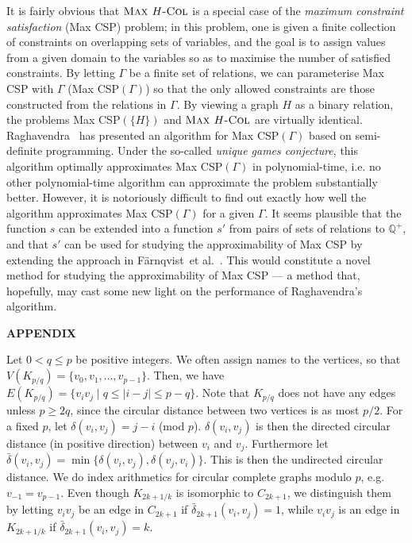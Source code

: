 \documentclass[11pt,a4paper]{article}
\begin{document}
It is fairly obvious that $\mbox{\sc Max $H$-Col}$ is a special case of the 
{\em maximum constraint satisfaction} ({\sc Max CSP}) problem;
in this problem, one is given a finite collection of constraints on overlapping
sets of variables, and the goal is to assign values from a given domain to the
variables so as to maximise the number of satisfied constraints.
By letting $\Gamma$ be a finite set of relations, we can
parameterise {\sc Max CSP} with $\Gamma$ ({\sc Max CSP}$(\Gamma)$) so that
the only allowed constraints are those constructed from the relations in $\Gamma$.
By viewing a graph $H$ as a binary relation, the problems {\sc Max CSP}$(\{H\})$
and $\mbox{\sc Max $H$-Col}$ are virtually identical. 
Raghavendra~\cite{raghavendra:08} has presented
an algorithm for {\sc Max CSP}$(\Gamma)$ based on semi-definite programming.
Under the so-called {\em unique games conjecture}, this algorithm
optimally approximates {\sc Max CSP}$(\Gamma)$ in polynomial-time, i.e. no
other polynomial-time algorithm can approximate the problem substantially better.
However, it is notoriously difficult to find out exactly how well the
algorithm approximates {\sc Max CSP}$(\Gamma)$ for a given $\Gamma$.
It seems plausible that
the function $s$ can be extended into a function $s'$ from pairs of sets
of relations to ${\mathbb Q}^+$, and that $s'$ can be used for studying
the approximability of {\sc Max CSP} by extending the approach in
F\"arnqvist~et al.~\cite{farnqvist:etal:09}. This would constitute a novel method for
studying the approximability of {\sc Max CSP} --- a method that, hopefully, may
cast some new light on the performance of Raghavendra's algorithm.




\newpage

\appendix
\begin{center}
  {\bf APPENDIX}
\end{center}




\noindent
Let  $0 < q \leq p$ be positive integers. We often assign names to the vertices, so that $V(K_{p/q}) = \{v_0,v_1,\ldots,v_{p-1}\}$. Then, we have $E(K_{p/q}) = \{v_i v_j \; | \; q \leq |i-j| \leq p-q\}$. Note that $K_{p/q}$ does not have any edges unless $p \geq 2q$, since the circular distance between two vertices is as most $p/2$. 
For a fixed $p$, let $\delta(v_i,v_j) = j - i$ (mod $p$). $\delta(v_i,v_j)$ is then the directed circular distance (in positive direction) between $v_i$ and $v_j$. Furthermore let $\bar{\delta}(v_i,v_j) = \min{\{\delta(v_i,v_j), \delta(v_j,v_i)\}}$. This is then the undirected circular distance. We do index arithmetics for circular complete graphs modulo $p$, e.g.
$v_{-1}=v_{p-1}$. Even though $K_{2k+1/k}$ is isomorphic to $C_{2k+1}$, we distinguish them by letting $v_i v_j$ be an edge in $C_{2k+1}$ if $\bar{\delta}_{2k+1}(v_i,v_j)=1$, while $v_i v_j$ is an edge in $K_{2k+1/k}$ if $\bar{\delta}_{2k+1}(v_i,v_j)=k$.
\end{document}
